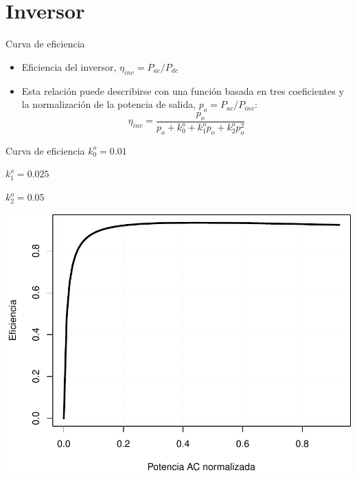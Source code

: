 \documentclass[xcolor={usenames,svgnames,dvipsnames}]{beamer}
\begin{document}
\section{Inversor}
\label{sec:orgd702ba3}

\begin{frame}[label={sec:org03abc4b}]{Curva de eficiencia}
\begin{itemize}
\item Eficiencia del inversor, \(\eta_{inv} = P_{ac} / P_{dc}\)

\item Esta relación puede describirse con una función basada en tres coeficientes y la normalización de la potencia de salida, \(p_{o}=P_{ac}/P_{inv}\): $$\eta_{inv}=\frac{p_{o}}{p_{o}+k_{0}^{o}+k_{1}^{o}p_{o}+k_{2}^{o}p_{o}^{2}}$$
\end{itemize}
\end{frame}


\begin{frame}[label={sec:orge8af27f}]{Curva de eficiencia}
\(k_{0}^{o}=0.01\)

\(k_{1}^{o}=0.025\)

\(k_{2}^{o}=0.05\)

\begin{center}
\includegraphics[width=.9\linewidth]{../figs/CurvaInversor.pdf}
\end{center}
\end{frame}
\end{document}
